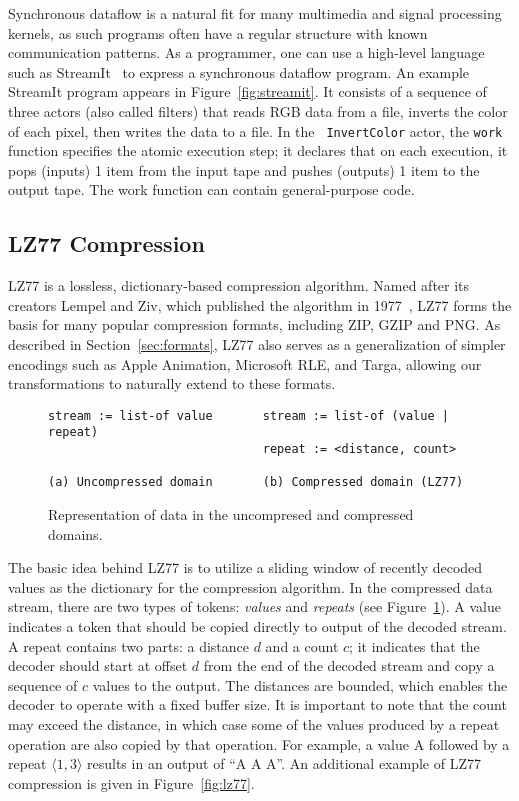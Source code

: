 Synchronous dataflow is a natural fit for many multimedia and signal
processing kernels, as such programs often have a regular structure
with known communication patterns.  As a programmer, one can use a
high-level language such as StreamIt~\cite{streamitcc} to express a
synchronous dataflow program.  An example StreamIt program appears in
Figure~\ref{fig:streamit}.  It consists of a sequence of three actors
(also called filters) that reads RGB data from a file, inverts the
color of each pixel, then writes the data to a file.  In the {\tt
InvertColor} actor, the {\tt work} function specifies the atomic
execution step; it declares that on each execution, it pops (inputs) 1
item from the input tape and pushes (outputs) 1 item to the output
tape.  The work function can contain general-purpose code.

\subsection{LZ77 Compression}

LZ77 is a lossless, dictionary-based compression algorithm.  Named
after its creators Lempel and Ziv, which published the algorithm in
1977~\cite{lz77}, LZ77 forms the basis for many popular compression
formats, including ZIP, GZIP and PNG.  As described in
Section~\ref{sec:formats}, LZ77 also serves as a generalization of
simpler encodings such as Apple Animation, Microsoft RLE, and Targa,
allowing our transformations to naturally extend to these formats.

\begin{figure}[t]
\scriptsize
\begin{verbatim}
stream := list-of value       stream := list-of (value | repeat)
                              repeat := <distance, count>

(a) Uncompressed domain       (b) Compressed domain (LZ77)
\end{verbatim}
\caption{Representation of data in the uncompresed and compressed
domains.  \protect\label{fig:domains}}
\end{figure}

The basic idea behind LZ77 is to utilize a sliding window of recently
decoded values as the dictionary for the compression algorithm.  In
the compressed data stream, there are two types of tokens: {\it
values} and {\it repeats} (see Figure~\ref{fig:domains}).  A value
indicates a token that should be copied directly to output of the
decoded stream.  A repeat contains two parts: a distance $d$ and a
count $c$; it indicates that the decoder should start at offset $d$
from the end of the decoded stream and copy a sequence of $c$ values
to the output.  The distances are bounded, which enables the decoder
to operate with a fixed buffer size.  It is important to note that the
count may exceed the distance, in which case some of the values
produced by a repeat operation are also copied by that operation.  For
example, a value A followed by a repeat $\langle1, 3\rangle$ results
in an output of ``A A A''.  An additional example of LZ77 compression
is given in Figure~\ref{fig:lz77}.

